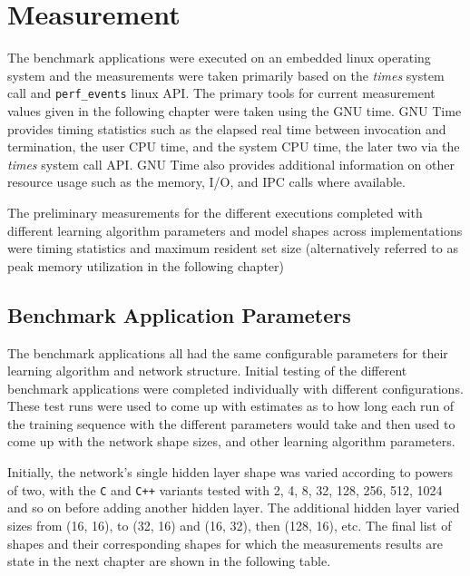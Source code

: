 \chapter{Measurement}

The benchmark applications were executed on an embedded linux operating system and the measurements were taken primarily based on the \textit{times} system call and \texttt{perf\_events} linux API. The primary tools for current measurement values given in the following chapter were taken using the GNU time. GNU Time provides timing statistics such as the elapsed real time between invocation and termination, the user CPU time, and the system CPU time, the later two via the \textit{times} system call API. GNU Time also provides additional information on other resource usage such as the memory, I/O, and IPC calls where available.

The preliminary measurements for the different executions completed with different learning algorithm parameters and model shapes across implementations were timing statistics and maximum resident set size (alternatively referred to as peak memory utilization in the following chapter)

\section{Benchmark Application Parameters}

The benchmark applications all had the same configurable parameters for their learning algorithm and network structure. Initial testing of the different benchmark applications were completed individually with different configurations. These test runs were used to come up with estimates as to how long each run of the training sequence with the different parameters would take and then used to come up with the network shape sizes, and other learning algorithm parameters.

Initially, the network's single hidden layer shape was varied according to powers of two, with the \texttt{C} and \texttt{C++} variants tested with 2, 4, 8, 32, 128, 256, 512, 1024 and so on before adding another hidden layer. The additional hidden layer varied sizes from (16, 16), to (32, 16) and (16, 32), then (128, 16), etc. The final list of shapes and their corresponding shapes for which the measurements results are state in the next chapter are shown in the following table.

